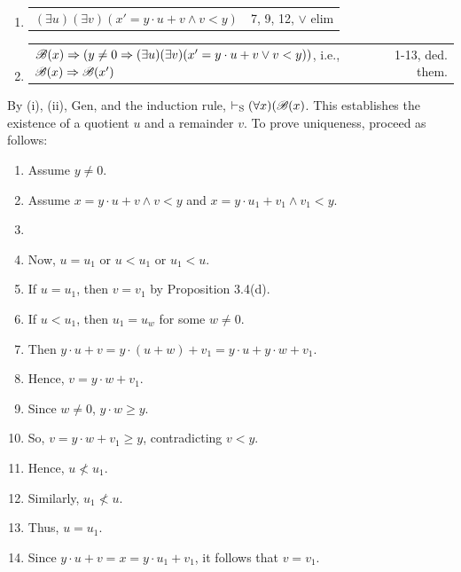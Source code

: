 \begin{enumerate} [label = \roman*.]
\begin{enumerate} [label = \arabic*.]
\begin{tabular}{p{8cm} r}
            \end{tabular}
        \item \begin{tabular}{p{8cm} r}
            $(\exists u)(\exists v)(x' = y \cdot u + v \land v < y)$ & 7, 9, 12, $\lor$ elim
            \end{tabular}
        \item \begin{tabular}{p{8cm} r}
            $\mathscr{B}(x) \Rightarrow (y\not = 0 \Rightarrow (\exists u)(\exists v)(x' = y \cdot u + v \lor v < y))$, i.e., $\mathscr{B}(x) \Rightarrow \mathscr{B}(x')$ & 1-13, ded. them.
            \end{tabular}
    \end{enumerate}
\end{enumerate}
By (i), (ii), Gen, and the induction rule, $\vdash_\text{S} (\forall x)(\mathscr{B}(x)$. This establishes the existence of a quotient $u$ and a remainder $v$. To prove uniqueness, proceed as follows:
\begin{enumerate}
    \item Assume $y \not = 0$.
    \item Assume $x = y \cdot u + v \land v < y$ and $x = y\cdot u_1 + v_1 \land v_1<y$.
    \item {}
    \item Now, $u = u_1$ or $u< u_1$ or $u_1 < u$.
    \item If $u = u_1$, then $v = v_1$ by Proposition 3.4(d).
    \item If $u < u_1$, then $u_1 = u _ w$ for some $w\not = 0$.
    \item Then $y \cdot u + v = y \cdot (u + w) + 
    v_1 = y \cdot u + y \cdot w + v_1$.
    \item Hence, $v=y \cdot w  + v_1$.
    \item Since $w \not = 0$, $y \cdot w \geq y$.
    \item So, $v = y \cdot w + v_1 \geq y$, contradicting $v < y$.
    \item Hence, $u \not < u_1$.
    \item Similarly, $u_1 \not < u$.
    \item Thus, $u=u_1$.
    \item Since $y \cdot u + v = x = y \cdot u_1 + v_1$, it follows that $v= v_1$.
\end{enumerate}

